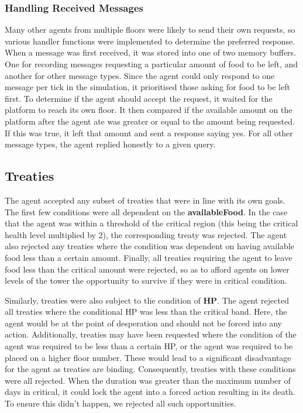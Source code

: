 \subsubsection{Handling Received Messages}
Many other agents from multiple floors were likely to send their own requests, so various handler functions were implemented to determine the preferred response. When a message was first received, it was stored into one of two memory buffers. One for recording messages requesting a particular amount of food to be left, and another for other message types. Since the agent could only respond to one message per tick in the simulation, it prioritised those asking for food to be left first. To determine if the agent should accept the request, it waited for the platform to reach its own floor. It then compared if the available amount on the platform after the agent ate was greater or equal to the amount being requested. If this was true, it left that amount and sent a response saying yes. For all other message types, the agent replied honestly to a given query. 

\subsection{Treaties} \label{team4Treaties}
The agent accepted any subset of treaties that were in line with its own goals. The first few conditions were all dependent on the \textbf{availableFood}. In the case that the agent was within a threshold of the critical region (this being the critical health level multiplied by 2), the corresponding treaty was rejected. The agent also rejected any treaties where the condition was dependent on having available food less than a certain amount. Finally, all treaties requiring the agent to leave food less than the critical amount were rejected, so as to afford agents on lower levels of the tower the opportunity to survive if they were in critical condition. 

Similarly, treaties were also subject to the condition of \textbf{HP}. The agent rejected all treaties where the conditional HP was less than the critical band. Here, the agent would be at the point of desperation and should not be forced into any action. Additionally, treaties may have been requested where the condition of the agent was required to be less than a certain HP, or the agent was required to be placed on a higher floor number. These would lead to a significant disadvantage for the agent as treaties are binding. Consequently, treaties with these conditions were all rejected. When the duration was greater than the maximum number of days in critical, it could lock the agent into a forced action resulting in its death. To ensure this didn't happen, we rejected all such opportunities. 

